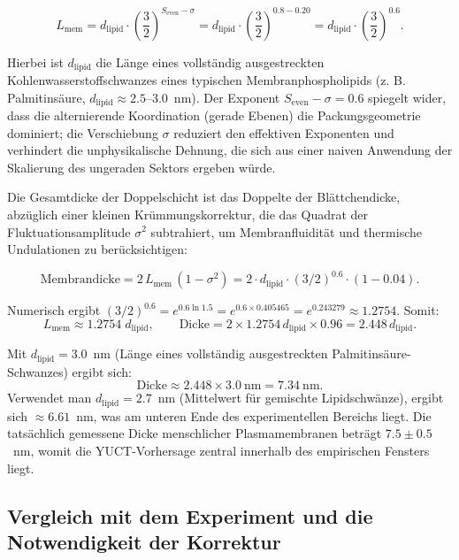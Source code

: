 \documentclass[12pt,a4paper]{article}
\begin{document}
	\[
	L_{\mathrm{mem}} = d_{\mathrm{lipid}} \cdot \left( \frac{3}{2} \right)^{S_{\mathrm{even}} - \sigma}
	= d_{\mathrm{lipid}} \cdot \left( \frac{3}{2} \right)^{0.8 - 0.20}
	= d_{\mathrm{lipid}} \cdot \left( \frac{3}{2} \right)^{0.6}.
	\]
	
	Hierbei ist \(d_{\mathrm{lipid}}\) die Länge eines vollständig ausgestreckten Kohlenwasserstoffschwanzes eines typischen Membranphospholipids (z. B. Palmitinsäure, \(d_{\mathrm{lipid}} \approx 2.5\)–\(3.0\)~nm). Der Exponent \(S_{\mathrm{even}} - \sigma = 0.6\) spiegelt wider, dass die alternierende Koordination (gerade Ebenen) die Packungsgeometrie dominiert; die Verschiebung \(\sigma\) reduziert den effektiven Exponenten und verhindert die unphysikalische Dehnung, die sich aus einer naiven Anwendung der Skalierung des ungeraden Sektors ergeben würde.
	
	Die Gesamtdicke der Doppelschicht ist das Doppelte der Blättchendicke, abzüglich einer kleinen Krümmungskorrektur, die das Quadrat der Fluktuationsamplitude \(\sigma^2\) subtrahiert, um Membranfluidität und thermische Undulationen zu berücksichtigen:
	
	\[
	\text{Membrandicke} = 2 \, L_{\mathrm{mem}} \, (1 - \sigma^2)
	= 2 \cdot d_{\mathrm{lipid}} \cdot (3/2)^{0.6} \cdot (1 - 0.04).
	\]
	
	Numerisch ergibt \((3/2)^{0.6} = e^{0.6 \ln 1.5} = e^{0.6 \times 0.405465} = e^{0.243279} \approx 1.2754\). Somit:
	\[
	L_{\mathrm{mem}} \approx 1.2754 \; d_{\mathrm{lipid}}, \qquad
	\text{Dicke} = 2 \times 1.2754 \, d_{\mathrm{lipid}} \times 0.96 = 2.448 \, d_{\mathrm{lipid}}.
	\]
	
	Mit \(d_{\mathrm{lipid}} = 3.0\)~nm (Länge eines vollständig ausgestreckten Palmitinsäure-Schwanzes) ergibt sich:
	\[
	\text{Dicke} \approx 2.448 \times 3.0\ \mathrm{nm} = 7.34\ \mathrm{nm}.
	\]
	Verwendet man \(d_{\mathrm{lipid}} = 2.7\)~nm (Mittelwert für gemischte Lipidschwänze), ergibt sich \(\approx 6.61\)~nm, was am unteren Ende des experimentellen Bereichs liegt. Die tatsächlich gemessene Dicke menschlicher Plasmamembranen beträgt \(7.5 \pm 0.5\)~nm, womit die YUCT-Vorhersage zentral innerhalb des empirischen Fensters liegt.
	
	\subsection*{Vergleich mit dem Experiment und die Notwendigkeit der Korrektur}
	
\end{document}
